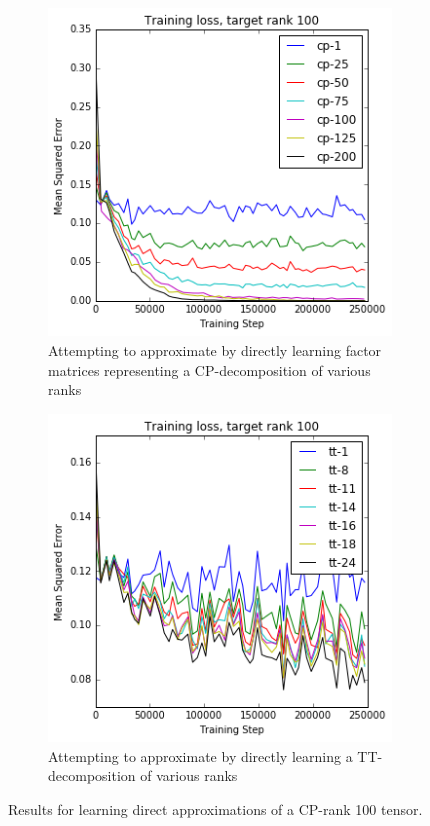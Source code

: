 \begin{figure}[ht]
\centering
\begin{subfigure}[t]{0.45\textwidth}
	\includegraphics[width=\textwidth]{tensors/cp100cpapprox}
	\caption{Attempting to approximate by directly learning factor matrices representing a 
		CP-decomposition of various ranks}
	\label{fig:cpcpapprox}
\end{subfigure}
\hfill
\begin{subfigure}[t]{0.45\textwidth}
	\includegraphics[width=\textwidth]{tensors/cp100ttapprox}
	\caption{Attempting to approximate by directly learning a TT-decomposition of various ranks}
	\label{fig:cpttapprox}
\end{subfigure}
\caption{Results for learning direct approximations of a CP-rank 100 tensor.}
 \label{fig:cpapprox}
\end{figure}

